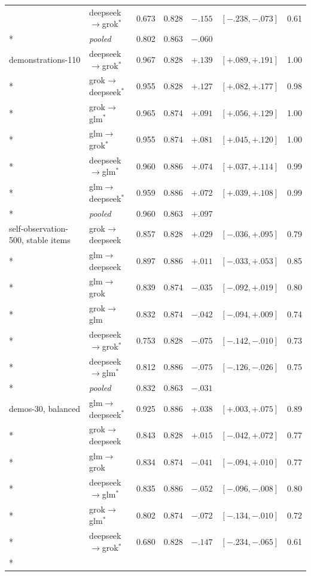 {\begin{longtable}{llrlrrr}
 & deepseek$\to$grok$^{*}$ & 0.673 & 0.828 & $-.155$ & $[-.238,-.073]$ & 0.61 \\*
 & \emph{pooled} & 0.802 & 0.863 & $-.060$ & & \\
\addlinespace
demonstrations-110 & deepseek$\to$grok$^{*}$ & 0.967 & 0.828 & $+.139$ & $[+.089,+.191]$ & 1.00 \\*
 & grok$\to$deepseek$^{*}$ & 0.955 & 0.828 & $+.127$ & $[+.082,+.177]$ & 0.98 \\*
 & grok$\to$glm$^{*}$ & 0.965 & 0.874 & $+.091$ & $[+.056,+.129]$ & 1.00 \\*
 & glm$\to$grok$^{*}$ & 0.955 & 0.874 & $+.081$ & $[+.045,+.120]$ & 1.00 \\*
 & deepseek$\to$glm$^{*}$ & 0.960 & 0.886 & $+.074$ & $[+.037,+.114]$ & 0.99 \\*
 & glm$\to$deepseek$^{*}$ & 0.959 & 0.886 & $+.072$ & $[+.039,+.108]$ & 0.99 \\*
 & \emph{pooled} & 0.960 & 0.863 & $+.097$ & & \\
\addlinespace
self-observation-500, stable items & grok$\to$deepseek & 0.857 & 0.828 & $+.029$ & $[-.036,+.095]$ & 0.79 \\*
 & glm$\to$deepseek & 0.897 & 0.886 & $+.011$ & $[-.033,+.053]$ & 0.85 \\*
 & glm$\to$grok & 0.839 & 0.874 & $-.035$ & $[-.092,+.019]$ & 0.80 \\*
 & grok$\to$glm & 0.832 & 0.874 & $-.042$ & $[-.094,+.009]$ & 0.74 \\*
 & deepseek$\to$grok$^{*}$ & 0.753 & 0.828 & $-.075$ & $[-.142,-.010]$ & 0.73 \\*
 & deepseek$\to$glm$^{*}$ & 0.812 & 0.886 & $-.075$ & $[-.126,-.026]$ & 0.75 \\*
 & \emph{pooled} & 0.832 & 0.863 & $-.031$ & & \\
\addlinespace
demos-30, balanced & glm$\to$deepseek$^{*}$ & 0.925 & 0.886 & $+.038$ & $[+.003,+.075]$ & 0.89 \\*
 & grok$\to$deepseek & 0.843 & 0.828 & $+.015$ & $[-.042,+.072]$ & 0.77 \\*
 & glm$\to$grok & 0.834 & 0.874 & $-.041$ & $[-.094,+.010]$ & 0.77 \\*
 & deepseek$\to$glm$^{*}$ & 0.835 & 0.886 & $-.052$ & $[-.096,-.008]$ & 0.80 \\*
 & grok$\to$glm$^{*}$ & 0.802 & 0.874 & $-.072$ & $[-.134,-.010]$ & 0.72 \\*
 & deepseek$\to$grok$^{*}$ & 0.680 & 0.828 & $-.147$ & $[-.234,-.065]$ & 0.61 \\*

\end{longtable}}
